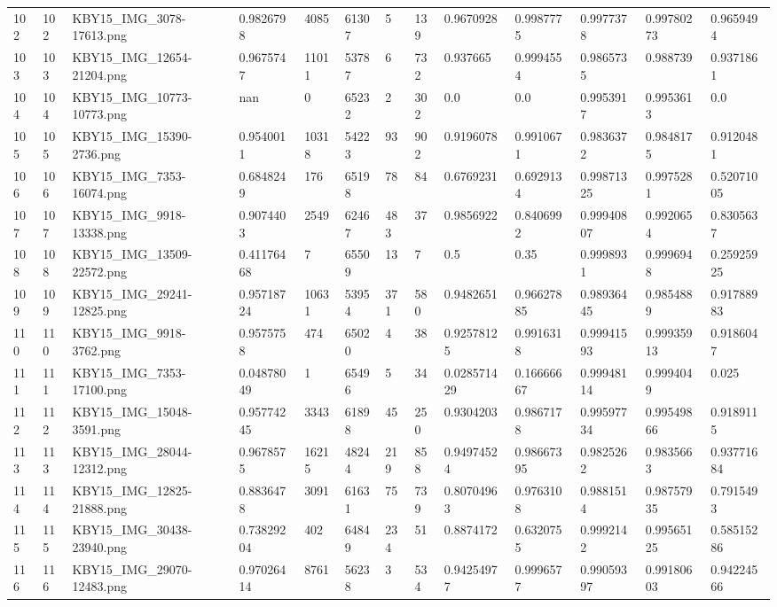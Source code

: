\documentclass[11pt, a4paper, twoside]{report}
\begin{document}
\begin{longtable}[c]{@{}lllllllllllll@{}}
102 & 102 & KBY15\_IMG\_3078-17613.png & 0.9826798 & 4085 & 61307 & 5 & 139 & 0.9670928 & 0.9987775 & 0.9977378 & 0.99780273 & 0.9659494 \\
103 & 103 & KBY15\_IMG\_12654-21204.png & 0.9675747 & 11011 & 53787 & 6 & 732 & 0.937665 & 0.9994554 & 0.9865735 & 0.988739 & 0.9371861 \\
104 & 104 & KBY15\_IMG\_10773-10773.png & nan & 0 & 65232 & 2 & 302 & 0.0 & 0.0 & 0.9953917 & 0.9953613 & 0.0 \\
105 & 105 & KBY15\_IMG\_15390-2736.png & 0.9540011 & 10318 & 54223 & 93 & 902 & 0.9196078 & 0.9910671 & 0.9836372 & 0.9848175 & 0.9120481 \\
106 & 106 & KBY15\_IMG\_7353-16074.png & 0.6848249 & 176 & 65198 & 78 & 84 & 0.6769231 & 0.6929134 & 0.99871325 & 0.9975281 & 0.52071005 \\
107 & 107 & KBY15\_IMG\_9918-13338.png & 0.9074403 & 2549 & 62467 & 483 & 37 & 0.9856922 & 0.8406992 & 0.99940807 & 0.9920654 & 0.8305637 \\
108 & 108 & KBY15\_IMG\_13509-22572.png & 0.41176468 & 7 & 65509 & 13 & 7 & 0.5 & 0.35 & 0.9998931 & 0.9996948 & 0.25925925 \\
109 & 109 & KBY15\_IMG\_29241-12825.png & 0.95718724 & 10631 & 53954 & 371 & 580 & 0.9482651 & 0.96627885 & 0.98936445 & 0.9854889 & 0.91788983 \\
110 & 110 & KBY15\_IMG\_9918-3762.png & 0.9575758 & 474 & 65020 & 4 & 38 & 0.92578125 & 0.9916318 & 0.99941593 & 0.99935913 & 0.9186047 \\
111 & 111 & KBY15\_IMG\_7353-17100.png & 0.04878049 & 1 & 65496 & 5 & 34 & 0.028571429 & 0.16666667 & 0.99948114 & 0.9994049 & 0.025 \\
112 & 112 & KBY15\_IMG\_15048-3591.png & 0.95774245 & 3343 & 61898 & 45 & 250 & 0.9304203 & 0.9867178 & 0.99597734 & 0.99549866 & 0.9189115 \\
113 & 113 & KBY15\_IMG\_28044-12312.png & 0.9678575 & 16215 & 48244 & 219 & 858 & 0.94974524 & 0.98667395 & 0.9825262 & 0.9835663 & 0.93771684 \\
114 & 114 & KBY15\_IMG\_12825-21888.png & 0.8836478 & 3091 & 61631 & 75 & 739 & 0.80704963 & 0.9763108 & 0.9881514 & 0.98757935 & 0.7915493 \\
115 & 115 & KBY15\_IMG\_30438-23940.png & 0.73829204 & 402 & 64849 & 234 & 51 & 0.8874172 & 0.6320755 & 0.9992142 & 0.99565125 & 0.58515286 \\
116 & 116 & KBY15\_IMG\_29070-12483.png & 0.97026414 & 8761 & 56238 & 3 & 534 & 0.94254977 & 0.9996577 & 0.99059397 & 0.99180603 & 0.94224566 \\

\end{longtable}
\end{document}
